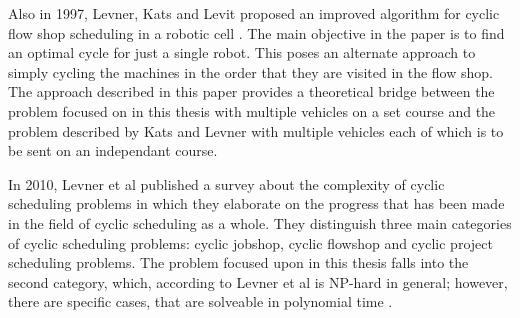 Also in 1997, Levner, Kats and Levit proposed an improved algorithm for cyclic flow shop scheduling in a robotic cell \cite{levner1997}. The main objective in the paper is to find an optimal cycle for just a single robot. This poses an alternate approach to simply cycling the machines in the order that they are visited in the flow shop. The approach described in this paper provides a theoretical bridge between the problem focused on in this thesis with multiple vehicles on a set course and the problem described by Kats and Levner \cite{kats1997b} with multiple vehicles each of which is to be sent on an independant course.

In 2010, Levner et al published a survey about the complexity of cyclic scheduling problems in which they elaborate on the progress that has been made in the field of cyclic scheduling as a whole. They distinguish three main categories of cyclic scheduling problems: cyclic jobshop, cyclic flowshop and cyclic project scheduling problems. The problem focused upon in this thesis falls into the second category, which, according to Levner et al is NP-hard in general; however, there are specific cases, that are solveable in polynomial time \cite{levner2010}.